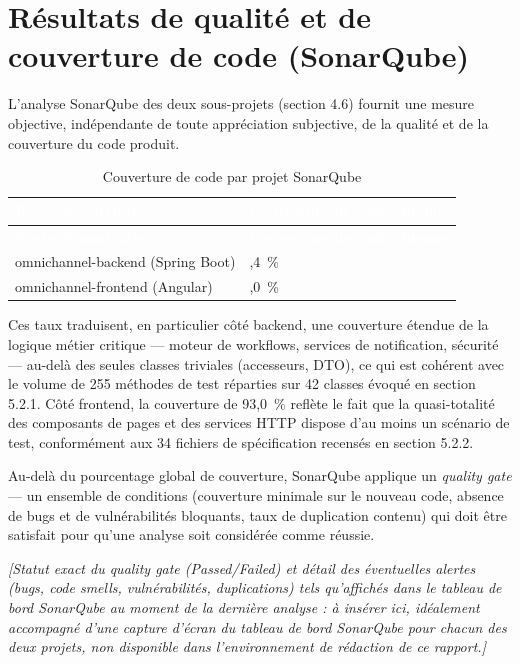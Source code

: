 \documentclass[12pt,a4paper]{report}
\newcommand{\placeholder}[1]{\par\smallskip\noindent\textcolor{placeholderred}{\itshape [#1]}\par\smallskip}
\begin{document}
\section{Résultats de qualité et de couverture de code (SonarQube)}

L'analyse SonarQube des deux sous-projets (section 4.6) fournit une mesure objective, indépendante de toute appréciation subjective, de la qualité et de la couverture du code produit.

\begin{longtable}{@{}>{\raggedright\arraybackslash}p{}>{\raggedright\arraybackslash}p{}@{}}
\caption{Couverture de code par projet SonarQube}\\
\hline
\rowcolor{darkblue}\textcolor{white}{\textbf{Projet SonarQube}} & \textcolor{white}{\textbf{Couverture de code obtenue}} \\
\hline
\endfirsthead
\hline
\rowcolor{darkblue}\textcolor{white}{\textbf{Projet SonarQube}} & \textcolor{white}{\textbf{Couverture de code obtenue}} \\
\hline
\endhead
\hline
\endfoot
omnichannel-backend (Spring Boot) & 87,4~\% \\
\hline
omnichannel-frontend (Angular) & 93,0~\% \\
\hline
\end{longtable}

Ces taux traduisent, en particulier côté backend, une couverture étendue de la logique métier critique --- moteur de workflows, services de notification, sécurité --- au-delà des seules classes triviales (accesseurs, DTO), ce qui est cohérent avec le volume de 255 méthodes de test réparties sur 42 classes évoqué en section 5.2.1. Côté frontend, la couverture de 93,0~\% reflète le fait que la quasi-totalité des composants de pages et des services HTTP dispose d'au moins un scénario de test, conformément aux 34 fichiers de spécification recensés en section 5.2.2.

Au-delà du pourcentage global de couverture, SonarQube applique un \textit{quality gate} --- un ensemble de conditions (couverture minimale sur le nouveau code, absence de bugs et de vulnérabilités bloquants, taux de duplication contenu) qui doit être satisfait pour qu'une analyse soit considérée comme réussie.

\placeholder{Statut exact du quality gate (Passed/Failed) et détail des éventuelles alertes (bugs, code smells, vulnérabilités, duplications) tels qu'affichés dans le tableau de bord SonarQube au moment de la dernière analyse : à insérer ici, idéalement accompagné d'une capture d'écran du tableau de bord SonarQube pour chacun des deux projets, non disponible dans l'environnement de rédaction de ce rapport.}
\end{document}
